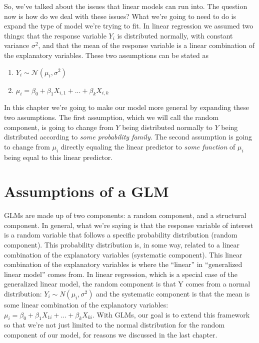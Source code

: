 \documentclass[
]{book}
\providecommand{\tightlist}{%
  \setlength{\itemsep}{0pt}\setlength{\parskip}{0pt}}
\begin{document}
So, we've talked about the issues that linear models can run into. The question now is how do we deal with these issues? What we're going to need to do is expand the type of model we're trying to fit. In linear regression we assumed two things: that the response variable \(Y_i\) is distributed normally, with constant variance \(\sigma^2\), and that the mean of the response variable is a linear combination of the explanatory variables. These two assumptions can be stated as

\begin{enumerate}
\def\labelenumi{\arabic{enumi}.}
\tightlist
\item
  \(Y_i \sim \mathcal{N}(\mu_i,\sigma^2)\)
\item
  \(\mu_i = \beta_0 + \beta_{1}X_{i,1}+...+\beta_{k}X_{i,k}\)
\end{enumerate}

In this chapter we're going to make our model more general by expanding these two assumptions. The first assumption, which we will call the random component, is going to change from \(Y\) being distributed normally to \(Y\) being distributed according to \emph{some probability family}. The second assumption is going to change from \(\mu_i\) directly equaling the linear predictor to \emph{some function} of \(\mu_i\) being equal to this linear predictor.

\hypertarget{assumptions-of-a-glm}{%
\section{Assumptions of a GLM}\label{assumptions-of-a-glm}}

GLMs are made up of two components: a random component, and a structural component. In general, what we're saying is that the response variable of interest is a random variable that follows a specific probability distribution (random component). This probability distribution is, in some way, related to a linear combination of the explanatory variables (systematic component). This linear combination of the explanatory variables is where the ``linear'' in ``generalized linear model'' comes from. In linear regression, which is a special case of the generalized linear model, the random component is that Y comes from a normal distribution: \(Y_i\sim N(\mu_i,\sigma^2)\) and the systematic component is that the mean is some linear combination of the explanatory variables: \(\mu_i=\beta_0+\beta_1X_{1i}+...+\beta_kX_{ki}\). With GLMs, our goal is to extend this framework so that we're not just limited to the normal distribution for the random component of our model, for reasons we discussed in the last chapter.
\end{document}
